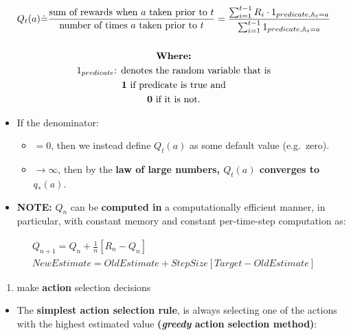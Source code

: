 \documentclass[12pt, a4paper]{article}
\begin{document}
\begin{gather*}
Q_t(a) \dot{=} \frac{\textrm{sum of rewards when } a \textrm{ taken prior to } t}{\textrm{number of times } a \textrm{ taken prior to } t} = \frac{\sum_{i=1}^{t-1} R_i \cdot 1_{predicate, \mathbb{A}_t = a}}{\sum_{i=1}^{t-1} 1_{predicate, \mathbb{A}_t = a}} \\ \\
  \textbf{Where:} \\
  1_{predicate} \text{: denotes the random variable that is} \\
  \text{\textbf{1} if predicate is true and} \\
  \text{\textbf{0} if it is not.} \\
\end{gather*}


\begin{itemize}

\item
  If the denominator:
  \begin{itemize}
  \item
    \(= 0\), then we instead define \(Q_t(a)\) as some default value
    (e.g.~zero).
  \item
    \(\rightarrow \infty\), then by the \textbf{law of large numbers,
    \(Q_t(a)\) converges to \(q_*(a)\)}.
  \end{itemize}
\item
  \textbf{NOTE:} \textbf{\(Q_n\)} can be \textbf{computed in} a
  computationally efficient manner, in particular, with constant memory
  and constant per-time-step computation as:
\end{itemize}

\begin{gather*}
  Q_{n+1} = Q_n + \frac{1}{n}[R_n - Q_n] \\
  NewEstimate = OldEstimate + StepSize[Target - OldEstimate]
\end{gather*}

\begin{enumerate}
\def\labelenumi{(\arabic{enumi})}
\setcounter{enumi}{1}
\item
  make \textbf{action} selection decisions
\end{enumerate}

\begin{itemize}
\item
  The \textbf{simplest action selection rule}, is always selecting one
  of the actions with the highest estimated value \textbf{(\emph{greedy}
  action selection method)}:
\end{itemize}
\end{document}
